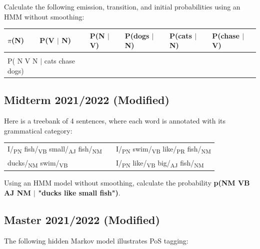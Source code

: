 \documentclass{../extra/aakpract/aakpract}
\begin{document}
	Calculate the following emission, transition, and initial probabilities using an HMM without smoothing:
	\begin{center}
		\begin{tabular}{|l|l|l|l|l|l|}
			\hline
			$ \pi $(N) & P(V $|$ N) & P(N $|$ V) & P(dogs $|$ N) & P(cats $|$ N) & P(chase $|$ V) \\
			\hline
			&&&&&\\
			\hline
			\multicolumn{2}{|l|}{P( N V N $|$ cats chase dogs)} & \multicolumn{4}{|l|}{} \\
			\hline
		\end{tabular}
	\end{center}
	
	\subsection{Midterm 2021/2022 (Modified)}
	
	Here is a treebank of 4 sentences, where each word is annotated with its grammatical category:
	\begin{center}
		\begin{tabular}{|lll|}
			\hline
			I/\textsubscript{PN} fish/\textsubscript{VB} small/\textsubscript{AJ} fish/\textsubscript{NM} &&
			I/\textsubscript{PN} swim/\textsubscript{VB} like/\textsubscript{PR} fish/\textsubscript{NM} \\
			ducks/\textsubscript{NM} swim/\textsubscript{VB} &&
			I/\textsubscript{PN} like/\textsubscript{VB} big/\textsubscript{AJ} fish/\textsubscript{NM} \\
			\hline
		\end{tabular}
	\end{center}
	
	Using an HMM model without smoothing, calculate the probability \textbf{p(NM VB AJ NM $|$ "ducks like small fish")}.
	
	
	\subsection{Master 2021/2022 (Modified)}
	
	The following hidden Markov model illustrates PoS tagging:
	
\end{document}
